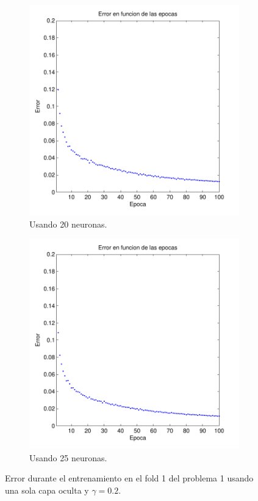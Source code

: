 \documentclass[informe.tex]{subfiles}
\begin{document}
\begin{figure}[H]
\begin{subfigure}[b]{0.32\textwidth}
                \includegraphics[width=\textwidth]{graficos/error_fold1_20_binary_100_02.pdf}
                \caption{Usando 20 neuronas.}
                \label{fig:d1-f1-02-n20}
        \end{subfigure}
        \begin{subfigure}[b]{0.32\textwidth}
                \includegraphics[width=\textwidth]{graficos/error_fold1_25_binary_100_02.pdf}
                \caption{Usando 25 neuronas.}
                \label{fig:d1-f1-02-n25}
        \end{subfigure}
        
        \caption{Error durante el entrenamiento en el fold 1 del problema 1 usando una sola capa oculta y $\gamma=0.2$.}\label{fig:p1-f1-gamma02}
    \end{figure}    
\end{document}
